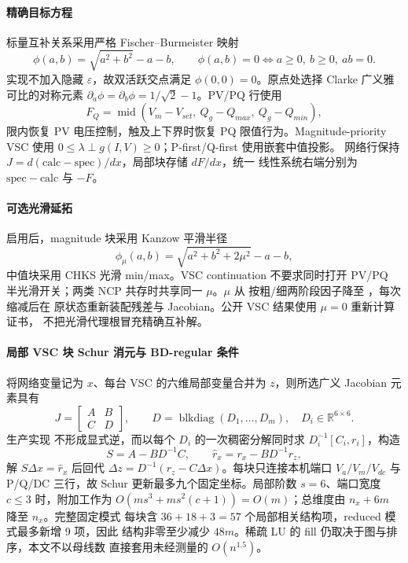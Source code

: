 \paragraph{精确目标方程} 标量互补关系采用严格 Fischer--Burmeister 映射
\[
\phi(a,b)=\sqrt{a^2+b^2}-a-b,
\qquad \phi(a,b)=0\Longleftrightarrow a\ge0,\ b\ge0,\ ab=0.
\]
实现不加入隐藏 $\varepsilon$，故双活跃交点满足 $\phi(0,0)=0$。原点处选择
Clarke 广义雅可比的对称元素
$\partial_a\phi=\partial_b\phi=1/\sqrt{2}-1$。PV/PQ 行使用
\[
F_Q=\operatorname{mid}(V_m-V_{set},\ Q_g-Q_{max},\ Q_g-Q_{min}),
\]
限内恢复 PV 电压控制，触及上下界时恢复 PQ 限值行为。Magnitude-priority
VSC 使用 $0\le\lambda\perp g(I,V)\ge0$；P-first/Q-first 使用嵌套中值投影。
网络行保持 $J=d(\mathrm{calc}-\mathrm{spec})/dx$，局部块存储 $dF/dx$，统一
线性系统右端分别为 $\mathrm{spec}-\mathrm{calc}$ 与 $-F$。

\paragraph{可选光滑延拓}  启用后，magnitude 块采用
Kanzow 平滑半径
\[
\phi_\mu(a,b)=\sqrt{a^2+b^2+2\mu^2}-a-b,
\]
中值块采用 CHKS 光滑 min/max。VSC continuation 不要求同时打开 PV/PQ
半光滑开关；两类 NCP 共存时共享同一 $\mu$。$\mu$ 从
 按粗/细两阶段因子降至 ，每次缩减后在
原状态重新装配残差与 Jacobian。公开 VSC 结果使用 $\mu=0$ 重新计算证书，
不把光滑代理根冒充精确互补解。

\paragraph{局部 VSC 块 Schur 消元与 BD-regular 条件}
将网络变量记为 $x$、每台 VSC 的六维局部变量合并为 $z$，则所选广义
Jacobian 元素具有
\[
J=\begin{bmatrix}A&B\\C&D\end{bmatrix},\qquad
D=\operatorname{blkdiag}(D_1,\ldots,D_m),\quad D_i\in\mathbb R^{6\times6}.
\]
生产实现  不形成显式逆，而以每个
$D_i$ 的一次稠密分解同时求 $D_i^{-1}[C_i,r_i]$，构造
\[
S=A-BD^{-1}C,\qquad \widehat r_x=r_x-BD^{-1}r_z,
\]
解 $S\Delta x=\widehat r_x$ 后回代
$\Delta z=D^{-1}(r_z-C\Delta x)$。每块只连接本机端口
$V_a/V_m/V_{dc}$ 与 P/Q/DC 三行，故 Schur 更新最多九个固定坐标。局部阶数
$s=6$、端口宽度 $c\le3$ 时，附加工作为
$O(ms^3+ms^2(c+1))=O(m)$；总维度由 $n_x+6m$ 降至 $n_x$。完整固定模式
每块含 $36+18+3=57$ 个局部相关结构项，reduced 模式最多新增 9 项，因此
结构非零至少减少 $48m$。稀疏 LU 的 fill 仍取决于图与排序，本文不以母线数
直接套用未经测量的 $O(n^{1.5})$。

